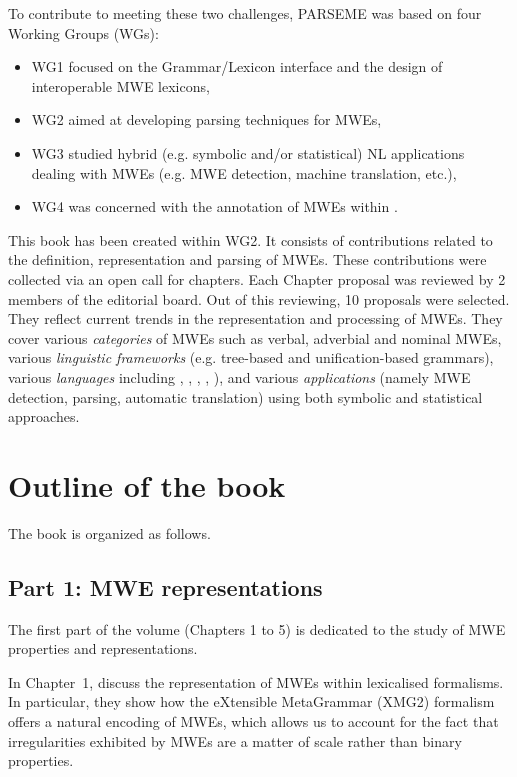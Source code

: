 \documentclass[output=paper]{langsci/langscibook}
\begin{document}
To contribute to meeting these two challenges, PARSEME was based on four
Working Groups (WGs):
\begin{itemize}
\item WG1 focused on the Grammar/Lexicon interface and the design of
  interoperable MWE lexicons,
\item WG2 aimed at developing parsing techniques for MWEs,
\item WG3 studied hybrid (e.g. symbolic and/or statistical) NL
  applications dealing with MWEs (e.g. MWE detection, machine
  translation, etc.),
\item WG4 was concerned with the annotation of MWEs within .
\end{itemize}

This book has been created within WG2. It consists of contributions
related to the definition, representation and parsing of MWEs. These
contributions were collected via an open call for chapters. Each
Chapter proposal was reviewed by 2 members of the editorial board. Out
of this reviewing, 10 proposals were selected. They reflect current
trends in the representation and processing of MWEs. They cover
various \emph{categories} of MWEs such as verbal, adverbial and
nominal MWEs, various \emph{linguistic frameworks} (e.g. tree-based
and unification-based grammars), various \emph{languages} including
, , , ,
), and various \emph{applications} (namely MWE
detection, parsing, automatic translation) using both symbolic and
statistical approaches.

\section{Outline of the book}

The book is organized as follows. 

\subsection*{Part 1: MWE representations}

The first part of the volume (Chapters 1 to 5) is dedicated to the
study of MWE properties and representations.

In Chapter~1, %
 discuss the representation of MWEs within
lexicalised formalisms. In particular, they show how the eXtensible
MetaGrammar (XMG2) formalism offers a natural encoding of MWEs, which
allows us to account for the fact that irregularities exhibited by
MWEs are a matter of scale rather than binary properties.
\end{document}
